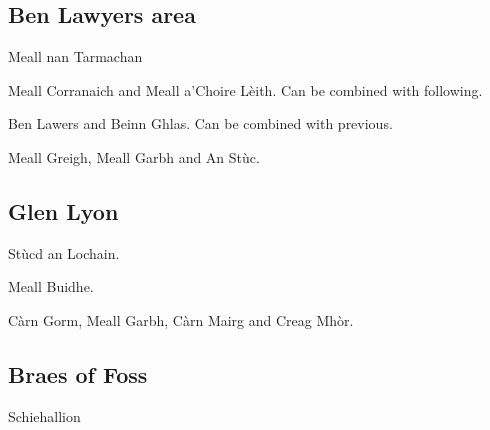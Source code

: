 

\subsection{Ben Lawyers area}

\begin{munros}
\item Meall nan Tarmachan

\item \target Meall Corranaich and Meall a'Choire Lèith.  Can be combined with
  following.

\item \target Ben Lawers and Beinn Ghlas.  Can be combined with previous.

\item Meall Greigh, Meall Garbh and An Stùc.
\end{munros}

\subsection{Glen Lyon}

\begin{munros}
\item
Stùcd an Lochain.

\item
Meall Buidhe.

\item
Càrn Gorm, Meall Garbh, Càrn Mairg and Creag Mhòr.

\end{munros}


\subsection{Braes of Foss}

\begin{munros}
\item
Schiehallion
\end{munros}

